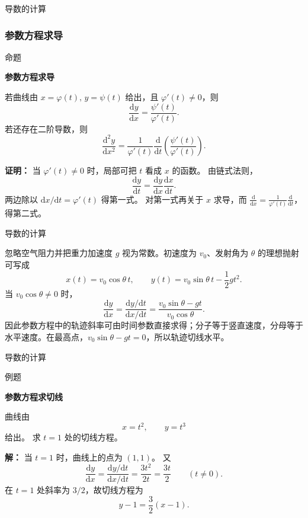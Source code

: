 \documentclass[aspectratio=169,10pt,fontset=fandol]{ctexbeamer}
\newcommand{\dd}{\mathrm{d}}
\begin{document}
\begin{frame}[t,fragile]{导数的计算}
\small
{\small
\subsubsection*{参数方程求导}


}
\begin{block}{命题}
{\small
\textbf{参数方程求导}\par

若曲线由 $x=\varphi(t),\,y=\psi(t)$ 给出，且 $\varphi'(t)\neq0$，则
\[
\frac{\dd y}{\dd x}=\frac{\psi'(t)}{\varphi'(t)}.
\]
若还存在二阶导数，则
\[
\frac{\dd^2y}{\dd x^2}
=\frac{1}{\varphi'(t)}\frac{\dd}{\dd t}\left(\frac{\psi'(t)}{\varphi'(t)}\right).
\]

}
\end{block}
\pause
{\small
\textbf{证明：}
当 $\varphi'(t)\neq0$ 时，局部可把 $t$ 看成 $x$ 的函数。 由链式法则，
\[
\frac{\dd y}{\dd t}=\frac{\dd y}{\dd x}\frac{\dd x}{\dd t}.
\]
两边除以 $\dd x/\dd t=\varphi'(t)$ 得第一式。 对第一式再关于 $x$ 求导，而 $\frac{\dd}{\dd x}=\frac1{\varphi'(t)}\frac{\dd}{\dd t}$，得第二式。

}
\end{frame}
\begin{frame}[t,fragile]{导数的计算}
\normalsize
{\normalsize
\begin{application}
忽略空气阻力并把重力加速度 $g$ 视为常数。初速度为 $v_0$、发射角为 $\theta$ 的理想抛射可写成
\[
x(t)=v_0\cos\theta\,t,\qquad
y(t)=v_0\sin\theta\,t-\frac12gt^2.
\]
当 $v_0\cos\theta\neq0$ 时，
\[
\frac{\dd y}{\dd x}
=\frac{\dd y/\dd t}{\dd x/\dd t}
=\frac{v_0\sin\theta-gt}{v_0\cos\theta}.
\]
因此参数方程中的轨迹斜率可由时间参数直接求得；分子等于竖直速度，分母等于水平速度。在最高点，$v_0\sin\theta-gt=0$，所以轨迹切线水平。
\end{application}
}
\end{frame}
\begin{frame}[t,fragile]{导数的计算}
\normalsize
\begin{block}{例题}
{\normalsize
\textbf{参数方程求切线}\par

曲线由
\[
x=t^2,\qquad y=t^3
\]
给出。 求 $t=1$ 处的切线方程。

}
\end{block}
\pause
{\normalsize
\textbf{解：}
当 $t=1$ 时，曲线上的点为 $(1,1)$。 又
\[
\frac{\dd y}{\dd x}
=\frac{\dd y/\dd t}{\dd x/\dd t}
=\frac{3t^2}{2t}
=\frac{3t}{2}\qquad(t\neq0).
\]
在 $t=1$ 处斜率为 $3/2$，故切线方程为
\[
y-1=\frac32(x-1).
\]

}
\end{frame}
\end{document}
